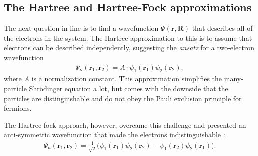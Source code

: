 \subsection{The Hartree and Hartree-Fock approximations}

The next question in line is to find a wavefunction $\Psi(\boldsymbol{r},\boldsymbol{R})$ that describes all of the electrons in the system. The Hartree \cite{Persson2020, DavidSholl2009} approximation to this is to assume that electrons can be described independently, suggesting the \textit{ansatz} for a two-electron wavefunction
\begin{align}
  \Psi_\kappa(\boldsymbol{r}_1,\boldsymbol{r}_2) = A \cdot \psi_1(\boldsymbol{r}_1) \psi_2(\boldsymbol{r}_2),
\end{align}
where $A$ is a normalization constant. This approximation simplifies the many-particle Shrödinger equation a lot, but comes with the downside that the particles are distinguishable and do not obey the Pauli exclusion principle for fermions.

The Hartree-fock approach, however, overcame this challenge and presented an anti-symmetric wavefunction that made the electrons indistinguishable \cite{Griffiths2017}:
\begin{align}
  \Psi_\kappa(\boldsymbol{r}_1,\boldsymbol{r}_2) = \frac{1}{\sqrt{2}}\Big( \psi_1(\boldsymbol{r}_1) \psi_2(\boldsymbol{r}_2)  - {\psi_1(\boldsymbol{r}_2)\psi_2(\boldsymbol{r}_1)}\Big).
\end{align}

